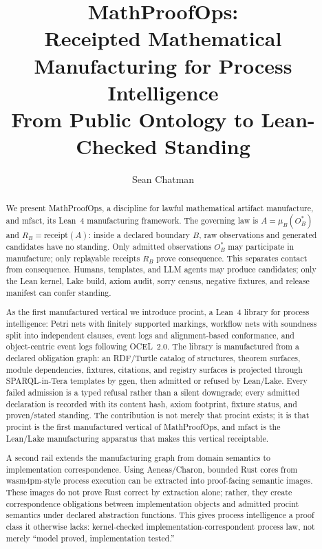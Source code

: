 \documentclass[11pt]{article}
\title{MathProofOps:\\Receipted Mathematical Manufacturing for Process Intelligence\\
\large From Public Ontology to Lean-Checked Standing}
\author{Sean Chatman}
\date{}
\begin{document}
\maketitle

\begin{abstract}
We present \textsf{MathProofOps}, a discipline for lawful mathematical
artifact manufacture, and \textsf{mfact}, its Lean~4 manufacturing
framework. The governing law is \(A = \mu_B(O^*_B)\) and \(R_B =
\mathrm{receipt}(A)\): inside a declared boundary \(B\), raw observations
and generated candidates have no standing. Only admitted observations
\(O^*_B\) may participate in manufacture; only replayable receipts \(R_B\)
prove consequence. This separates contact from consequence. Humans,
templates, and LLM agents may produce candidates; only the Lean kernel,
Lake build, axiom audit, sorry census, negative fixtures, and release
manifest can confer standing.

As the first manufactured vertical we introduce \textsf{procint}, a Lean~4
library for process intelligence: Petri nets with finitely supported
markings, workflow nets with soundness split into independent clauses,
event logs and alignment-based conformance, and object-centric event logs
following OCEL~2.0. The library is manufactured from a declared obligation
graph: an RDF/Turtle catalog of structures, theorem surfaces, module
dependencies, fixtures, citations, and registry surfaces is projected
through SPARQL-in-Tera templates by \textsf{ggen}, then admitted or
refused by Lean/Lake. Every failed admission is a typed refusal rather
than a silent downgrade; every admitted declaration is recorded with its
content hash, axiom footprint, fixture status, and proven/stated standing. The
contribution is not merely that \textsf{procint} exists; it is that
\textsf{procint} is the first manufactured vertical of MathProofOps, and
\textsf{mfact} is the Lean/Lake manufacturing apparatus that makes this
vertical receiptable.

A second rail extends the manufacturing graph from domain semantics to
implementation correspondence. Using Aeneas/Charon, bounded Rust cores from
\textsf{wasm4pm}-style process execution can be extracted into
proof-facing semantic images. These images do not prove Rust correct by
extraction alone; rather, they create correspondence obligations between
implementation objects and admitted \textsf{procint} semantics under
declared abstraction functions. This gives process intelligence a proof
class it otherwise lacks: kernel-checked implementation-correspondent
process law, not merely ``model proved, implementation tested.''


\end{abstract}
\end{document}
